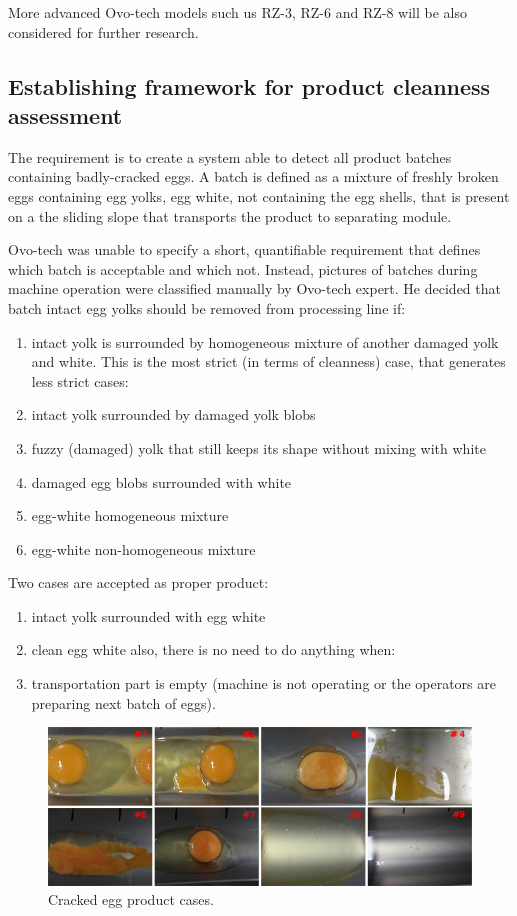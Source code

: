 \documentclass[12pt,twoside,a4paper]{article}
\begin{document}
More advanced Ovo-tech models such us RZ-3, RZ-6 and RZ-8 will be also considered for further research.


\subsection{Establishing framework for product cleanness assessment}

The requirement is to create a system able to detect all product batches containing badly-cracked eggs.
A batch is defined as a mixture of freshly broken eggs containing egg yolks, egg white, not containing the egg shells, that is present on a the sliding slope that transports the product to separating module.

Ovo-tech was unable to specify a short, quantifiable requirement that defines which batch is acceptable and which not. Instead, pictures of batches during machine operation were classified manually by Ovo-tech expert. He decided that batch intact egg yolks should be removed from processing line if:

\begin{enumerate}
\item intact yolk is surrounded by homogeneous mixture of another damaged yolk and white.
This is the most strict (in terms of cleanness) case, that generates less strict cases:
\item intact yolk surrounded by damaged yolk blobs
\item fuzzy (damaged) yolk that still keeps its shape without mixing with white
\item damaged egg blobs surrounded with white
\item egg-white homogeneous mixture
\item egg-white non-homogeneous mixture
\end{enumerate}
Two cases are accepted as proper product:
\begin{enumerate}[resume]
\item intact yolk surrounded with egg white
\item clean egg white
also, there is no need to do anything when:
\item transportation part is empty (machine is not operating or the operators are preparing next batch of eggs).
\end{enumerate}

 

\begin{figure}[H]
\centering
\includegraphics[width=0.8\paperwidth]{8of9}
\caption{Cracked egg product cases.}
\end{figure}
\end{document}
